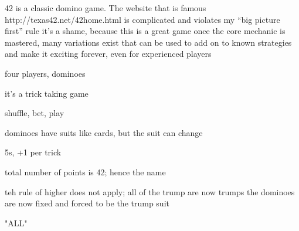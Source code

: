 
42 is a classic domino game. The website that is famous
http://texas42.net/42home.html
is complicated and violates my ``big picture first'' rule
it's a shame, because this is a great game
once the core mechanic is mastered, many variations exist that can be used to add on to known strategies and make it exciting forever, even for experienced players


four players, dominoes

it's a trick taking game


shuffle, bet, play


dominoes have suits like cards, but the suit can change


5s, +1 per trick

total number of points is 42; hence the name




teh rule of higher does not apply; all of the trump are now trumps
the dominoes are now fixed and forced to be the trump suit


"ALL"
